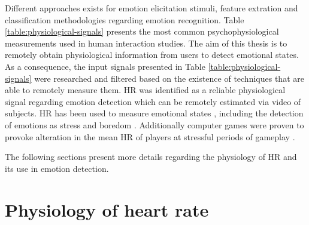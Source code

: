 Different approaches exists for emotion elicitation stimuli, feature extration and classification methodologies regarding emotion recognition. Table \ref{table:physiological-signals} presents the most common psychophysiological measurements used in human interaction studies. The aim of this thesis is to remotely obtain physiological information from users to detect emotional states. As a consequence, the input signals presented in Table \ref{table:physiological-signals} were researched and filtered based on the existence of techniques that are able to remotely measure them. HR was identified as a reliable physiological signal regarding emotion detection which can be remotely estimated via video of subjects. HR has been used to measure emotional states \parencite{kivikangas2011review}, including the detection of emotions as stress \parencite{choi2009using} and boredom \parencite{yamakoshi2007preliminary}. Additionally computer games were proven to provoke alteration in the mean HR of players at stressful periods of gameplay \parencite{sharma2006assessment,rodriguez2015vr}.

The following sections present more details regarding the physiology of HR and its use in emotion detection.



\section{Physiology of heart rate}


